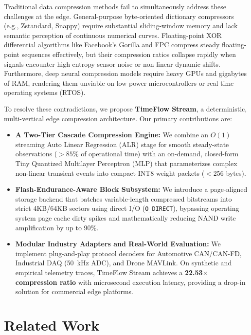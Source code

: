 \documentclass[journal]{IEEEtran}
\begin{document}
Traditional data compression methods fail to simultaneously address these challenges at the edge. General-purpose byte-oriented dictionary compressors (e.g., Zstandard, Snappy) require substantial sliding-window memory and lack semantic perception of continuous numerical curves. Floating-point XOR differential algorithms like Facebook's Gorilla \cite{pelkonen2015gorilla} and FPC \cite{buragohain2007fpc} compress steady floating-point sequences effectively, but their compression ratios collapse rapidly when signals encounter high-entropy sensor noise or non-linear dynamic shifts. Furthermore, deep neural compression models require heavy GPUs and gigabytes of RAM, rendering them unviable on low-power microcontrollers or real-time operating systems (RTOS).

To resolve these contradictions, we propose \textbf{TimeFlow Stream}, a deterministic, multi-vertical edge compression architecture. Our primary contributions are:
\begin{itemize}
    \item \textbf{A Two-Tier Cascade Compression Engine:} We combine an $O(1)$ streaming Auto Linear Regression (ALR) stage for smooth steady-state observations ($>85\%$ of operational time) with an on-demand, closed-form Tiny Quantized Multilayer Perceptron (MLP) that parameterizes complex non-linear transient events into compact INT8 weight packets ($<256$ bytes).
    \item \textbf{Flash-Endurance-Aware Block Subsystem:} We introduce a page-aligned storage backend that batches variable-length compressed bitstreams into strict 4KB/64KB sectors using direct I/O (\texttt{O\_DIRECT}), bypassing operating system page cache dirty spikes and mathematically reducing NAND write amplification by up to 90\%.
    \item \textbf{Modular Industry Adapters and Real-World Evaluation:} We implement plug-and-play protocol decoders for Automotive CAN/CAN-FD, Industrial DAQ (50~kHz ADC), and Drone MAVLink. On synthetic and empirical telemetry traces, TimeFlow Stream achieves a \textbf{22.53$\times$ compression ratio} with microsecond execution latency, providing a drop-in solution for commercial edge platforms.
\end{itemize}

\section{Related Work}
\end{document}
